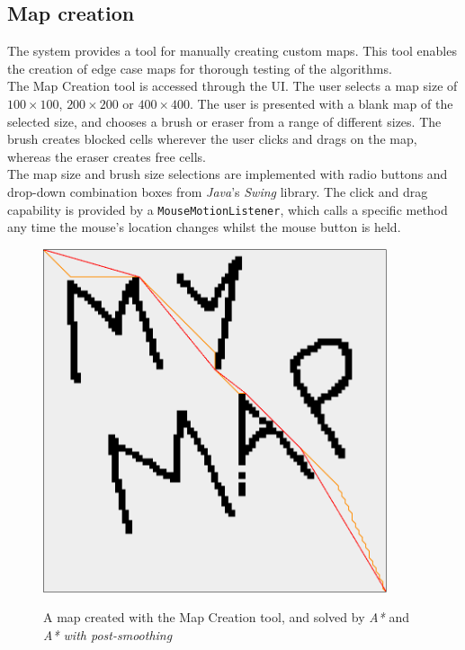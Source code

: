 \documentclass[12pt,notitlepage]{report}
\begin{document}
\subsection{Map creation}

The system provides a tool for manually creating custom maps. This tool enables the creation of edge case maps for thorough testing of the algorithms.\\

\noindent
The Map Creation tool is accessed through the UI. The user selects a map size of $100 \times 100$, $200 \times 200$ or $400 \times 400$. The user is presented with a blank map of the selected size, and chooses a brush or eraser from a range of different sizes. The brush creates blocked cells wherever the user clicks and drags on the map, whereas the eraser creates free cells.\\

\noindent
The map size and brush size selections are implemented with radio buttons and drop-down combination boxes from {\em Java}'s {\em Swing} library. The click and drag capability is provided by a {\tt MouseMotionListener}, which calls a specific method any time the mouse's location changes whilst the mouse button is held.

\begin{figure}
\centering
  {\includegraphics[width=0.9\textwidth]{creationmode.png}}
  \caption[A map created with the Map Creation tool]{A map created with the Map Creation tool, and solved by {\em A*} and {\em A* with post-smoothing}} 
\end{figure}
\end{document}
